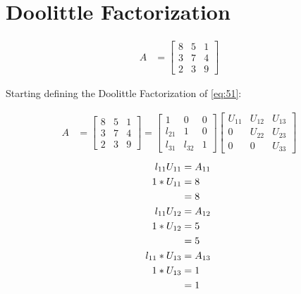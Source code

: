 \section{Doolittle Factorization}

	\begin{align}
		A &= \begin{bmatrix}
				8 & 5 & 1 \\[0.3em]
				3 & 7 & 4 \\[0.3em]
				2 & 3 & 9
			\end{bmatrix}&
	\label{eq:51}
	\end{align}

	Starting defining the Doolittle Factorization of \cref{eq:51}:

	\begin{align}
		A &= \begin{bmatrix}
				8 & 5 & 1 \\[0.3em]
				3 & 7 & 4 \\[0.3em]
				2 & 3 & 9
			\end{bmatrix}
			=
			\begin{bmatrix}
				1 & 0 & 0 \\[0.3em]
				l_{21} & 1 & 0 \\[0.3em]
				l_{31} & l_{32} & 1
			\end{bmatrix}
			\begin{bmatrix}
				U_{11} & U_{12} & U_{13} \\[0.3em]
				0 & U_{22} & U_{23} \\[0.3em]
				0 & 0 & U_{33}
			\end{bmatrix}&
	\end{align}
	\begin{align}
		l_{11}U_{11} &= A_{11}& \notag \\
		1*U_{11} &= 8& \notag \\
		&= 8& \\
		l_{11}U_{12} &= A_{12}& \notag \\
		1*U_{12} &= 5& \notag \\
		&= 5& \\
		l_{11}*U_{13} &= A_{13}& \notag \\
		1*U_{13} &= 1& \notag \\
		&= 1&
	\end{align}

